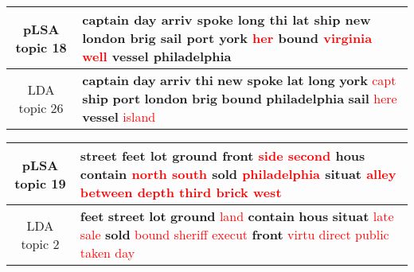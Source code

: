 \begin{center}\begin{tabularx}{\textwidth} {
  | c | >{\raggedright\arraybackslash}X | } \hline 
pLSA topic 18 & \textbf{captain} \textbf{day} \textbf{arriv} \textbf{spoke} \textbf{long} \textbf{thi} \textbf{lat} \textbf{ship} \textbf{new} \textbf{london} \textbf{brig} \textbf{sail} \textbf{port} \textbf{york} \textcolor{red}{her} \textbf{bound} \textcolor{red}{virginia} \textcolor{red}{well} \textbf{vessel} \textbf{philadelphia} \\ \hline 
LDA topic 26 & \textbf{captain} \textbf{day} \textbf{arriv} \textbf{thi} \textbf{new} \textbf{spoke} \textbf{lat} \textbf{long} \textbf{york} \textcolor{red}{capt} \textbf{ship} \textbf{port} \textbf{london} \textbf{brig} \textbf{bound} \textbf{philadelphia} \textbf{sail} \textcolor{red}{here} \textbf{vessel} \textcolor{red}{island} \\ \hline 
\end{tabularx}

\end{center}

\begin{center}\begin{tabularx}{\textwidth} {
  | c | >{\raggedright\arraybackslash}X | } \hline 
pLSA topic 19 & \textbf{street} \textbf{feet} \textbf{lot} \textbf{ground} \textbf{front} \textcolor{red}{side} \textcolor{red}{second} \textbf{hous} \textbf{contain} \textcolor{red}{north} \textcolor{red}{south} \textbf{sold} \textcolor{red}{philadelphia} \textbf{situat} \textcolor{red}{alley} \textcolor{red}{between} \textcolor{red}{depth} \textcolor{red}{third} \textcolor{red}{brick} \textcolor{red}{west} \\ \hline 
LDA topic 2 & \textbf{feet} \textbf{street} \textbf{lot} \textbf{ground} \textcolor{red}{land} \textbf{contain} \textbf{hous} \textbf{situat} \textcolor{red}{late} \textcolor{red}{sale} \textbf{sold} \textcolor{red}{bound} \textcolor{red}{sheriff} \textcolor{red}{execut} \textbf{front} \textcolor{red}{virtu} \textcolor{red}{direct} \textcolor{red}{public} \textcolor{red}{taken} \textcolor{red}{day} \\ \hline 
\end{tabularx}

\end{center}

